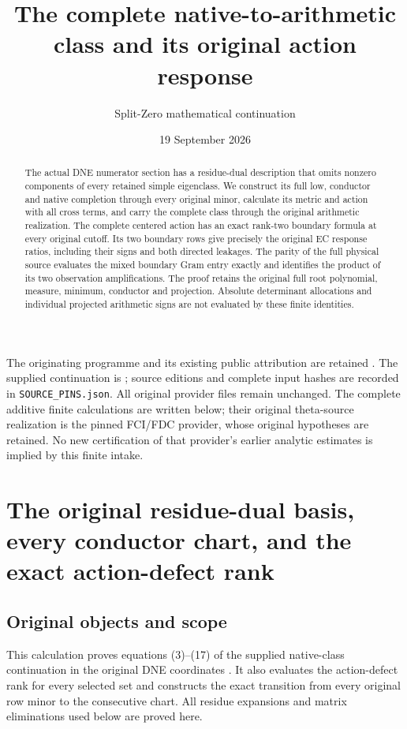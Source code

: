 \documentclass[11pt,a4paper]{article}
\title{The complete native-to-arithmetic class and its original action response}
\author{Split-Zero mathematical continuation}
\date{19 September 2026}
\begin{document}
\maketitle
\begin{abstract}
The actual DNE numerator section has a residue-dual description that omits
nonzero components of every retained simple eigenclass. We construct its
full low, conductor and native completion through every original minor,
calculate its metric and action with all cross terms, and carry the
complete class through the original arithmetic realization. The complete
centered action has an exact rank-two boundary formula at every original
cutoff. Its two boundary rows give precisely the original EC response
ratios, including their signs and both directed leakages. The parity of
the full physical source evaluates the mixed boundary Gram entry exactly
and identifies the product of its two observation amplifications. The
proof retains the original full root polynomial, measure, minimum,
conductor and projection. Absolute determinant allocations and individual
projected arithmetic signs are not evaluated by these finite identities.
\end{abstract}
The originating programme and its existing public attribution are
retained \cite{human:globalization2026,human:splitzero2026}.
The supplied continuation is \cite{prog:arrival02}; source editions and
complete input hashes are recorded in \texttt{SOURCE\_PINS.json}.
All original provider files remain unchanged. The complete additive
finite calculations are written below; their original theta-source
realization is the pinned FCI/FDC provider, whose original hypotheses
are retained. No new certification of that provider's earlier analytic
estimates is implied by this finite intake.

\section{The original residue-dual basis, every conductor chart,
and the exact action-defect rank}

\subsection{Original objects and scope}
This calculation proves equations (3)--(17) of the supplied
native-class continuation \cite{prog:arrival02} in the original DNE
coordinates \cite{prog:DNE}. It also evaluates the action-defect rank
for every selected set and constructs the exact transition from every
original row minor to the consecutive chart. All residue expansions and
matrix eliminations used below are proved here.
\end{document}
